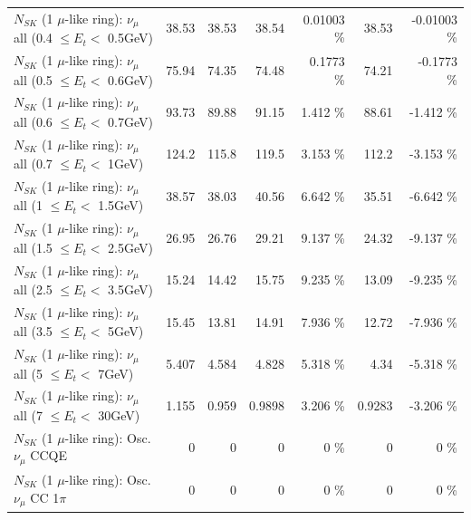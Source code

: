 \begin{table}
\begin{tabular}{| l | r | r | r  r | r  r |}
       $N_{SK}$ (1 $\mu$-like ring): $\nu_{\mu}$ all (0.4 $\leq E_{t} <$ 0.5GeV) &           38.53 &           38.53 &           38.54 &  0.01003 \%  &           38.53 & -0.01003 \%  \\ 
       $N_{SK}$ (1 $\mu$-like ring): $\nu_{\mu}$ all (0.5 $\leq E_{t} <$ 0.6GeV) &           75.94 &           74.35 &           74.48 &   0.1773 \%  &           74.21 &  -0.1773 \%  \\ 
       $N_{SK}$ (1 $\mu$-like ring): $\nu_{\mu}$ all (0.6 $\leq E_{t} <$ 0.7GeV) &           93.73 &           89.88 &           91.15 &    1.412 \%  &           88.61 &   -1.412 \%  \\ 
         $N_{SK}$ (1 $\mu$-like ring): $\nu_{\mu}$ all (0.7 $\leq E_{t} <$ 1GeV) &           124.2 &           115.8 &           119.5 &    3.153 \%  &           112.2 &   -3.153 \%  \\ 
         $N_{SK}$ (1 $\mu$-like ring): $\nu_{\mu}$ all (1 $\leq E_{t} <$ 1.5GeV) &           38.57 &           38.03 &           40.56 &    6.642 \%  &           35.51 &   -6.642 \%  \\ 
       $N_{SK}$ (1 $\mu$-like ring): $\nu_{\mu}$ all (1.5 $\leq E_{t} <$ 2.5GeV) &           26.95 &           26.76 &           29.21 &    9.137 \%  &           24.32 &   -9.137 \%  \\ 
       $N_{SK}$ (1 $\mu$-like ring): $\nu_{\mu}$ all (2.5 $\leq E_{t} <$ 3.5GeV) &           15.24 &           14.42 &           15.75 &    9.235 \%  &           13.09 &   -9.235 \%  \\ 
         $N_{SK}$ (1 $\mu$-like ring): $\nu_{\mu}$ all (3.5 $\leq E_{t} <$ 5GeV) &           15.45 &           13.81 &           14.91 &    7.936 \%  &           12.72 &   -7.936 \%  \\ 
           $N_{SK}$ (1 $\mu$-like ring): $\nu_{\mu}$ all (5 $\leq E_{t} <$ 7GeV) &           5.407 &           4.584 &           4.828 &    5.318 \%  &            4.34 &   -5.318 \%  \\ 
          $N_{SK}$ (1 $\mu$-like ring): $\nu_{\mu}$ all (7 $\leq E_{t} <$ 30GeV) &           1.155 &           0.959 &          0.9898 &    3.206 \%  &          0.9283 &   -3.206 \%  \\ 
\hline
\hline
                               $N_{SK}$ (1 $\mu$-like ring): Osc. $\nu_\mu$ CCQE &               0 &               0 &               0 &        0 \%  &               0 &        0 \%  \\ 
                          $N_{SK}$ (1 $\mu$-like ring): Osc. $\nu_\mu$ CC 1$\pi$ &               0 &               0 &               0 &        0 \%  &               0 &        0 \%  \\ 

\end{tabular}
\end{table}
